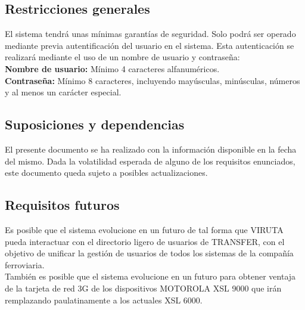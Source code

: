 \subsection{Restricciones generales}

El sistema tendrá unas mínimas garantías de seguridad. Solo podrá ser operado mediante previa autentificación del usuario en el sistema. Esta autenticación se realizará mediante el uso de un nombre de usuario y contraseña:\\

\textbf{Nombre de usuario:} Mínimo 4 caracteres alfanuméricos.\\

\textbf{Contraseña:} Mínimo 8 caracteres, incluyendo mayúsculas, minúsculas, números y al menos un carácter especial.

\subsection{Suposiciones y dependencias}

El presente documento se ha realizado con la información disponible en la fecha del mismo. Dada la volatilidad esperada de alguno de los requisitos enunciados, este documento queda sujeto a posibles actualizaciones.

\subsection{Requisitos futuros}

Es posible que el sistema evolucione en un futuro de tal forma que VIRUTA pueda interactuar con el directorio ligero de usuarios de TRANSFER, con el objetivo de unificar la gestión de usuarios de todos los sistemas de la compañía ferroviaria.\\

También es posible que el sistema evolucione en un futuro para obtener ventaja de la tarjeta de red 3G de los dispositivos MOTOROLA XSL 9000 que irán remplazando paulatinamente a los actuales XSL 6000.